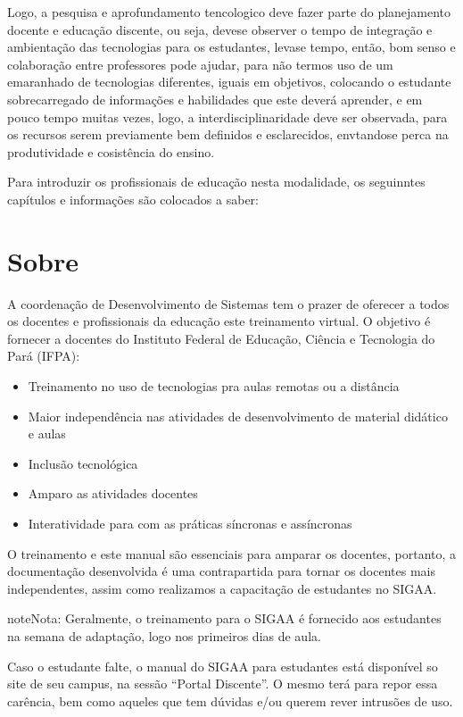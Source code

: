 \documentclass[letterpaper,10pt,brazil]{sphinxmanual}
\begin{document}
Logo, a pesquisa e aprofundamento tencologico deve fazer parte do planejamento docente e educação discente, ou seja, deve\sphinxhyphen{}se observer o tempo de integração e ambientação das tecnologias para os estudantes, leva\sphinxhyphen{}se tempo, então, bom senso e colaboração entre professores pode ajudar, para não termos uso de um emaranhado de tecnologias diferentes, iguais em objetivos, colocando o estudante sobrecarregado de informações e habilidades que este deverá aprender, e em pouco tempo muitas vezes, logo, a interdisciplinaridade deve ser observada, para os recursos serem previamente bem definidos e esclarecidos, envtando\sphinxhyphen{}se perca na produtividade e cosistência do ensino.

Para introduzir os profissionais de educação nesta modalidade, os seguinntes capítulos e informações são colocados a saber:


\chapter{Sobre}
\label{\detokenize{sobre:sobre}}\label{\detokenize{sobre::doc}}
A coordenação de Desenvolvimento de Sistemas tem o prazer de oferecer a todos os docentes e profissionais da educação este treinamento virtual.
O objetivo é fornecer a docentes do Instituto Federal de Educação, Ciência e Tecnologia do Pará (IFPA):
\begin{itemize}
\item {} 
Treinamento no uso de tecnologias pra aulas remotas ou a distância

\item {} 
Maior independência nas atividades de desenvolvimento de material didático e aulas

\item {} 
Inclusão tecnológica

\item {} 
Amparo as atividades docentes

\item {} 
Interatividade para com as práticas síncronas e assíncronas

\end{itemize}

O treinamento e este manual são essenciais para amparar os docentes, portanto, a documentação desenvolvida é uma contrapartida para tornar os docentes mais independentes, assim como realizamos a capacitação de estudantes no SIGAA.

\begin{sphinxadmonition}{note}{Nota:}
Geralmente, o treinamento para o SIGAA é fornecido aos estudantes na semana de adaptação, logo nos primeiros dias de aula.

Caso o estudante falte, o manual do SIGAA para estudantes está disponível so site de seu campus, na sessão “Portal Discente”. O mesmo terá para repor essa carência, bem como aqueles que tem dúvidas e/ou querem rever intrusões de uso.
\end{sphinxadmonition}
\end{document}
